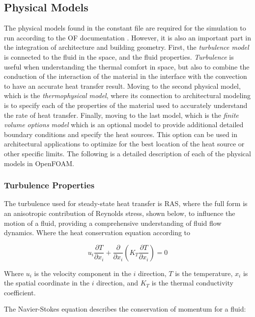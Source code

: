 \subsection{Physical Models}
The physical models found in the constant file are required for the simulation to run according to the \gls{OF} documentation \cite{OFD}. However, it is also an important part in the integration of architecture and building geometry. First, the \textit{turbulence model} is connected to the fluid in the space, and the fluid properties. \textit{Turbulence} is useful when understanding the thermal comfort in space, but also to combine the conduction of the interaction of the material in the interface with the convection to have an accurate heat transfer result. Moving to the second physical model, which is the \textit{ thermophysical model}, where its connection to architectural modeling is to specify each of the properties of the material used to accurately understand the rate of heat transfer. Finally, moving to the last model, which is the \textit{finite volume options model} which is an optional model to provide additional detailed boundary conditions and specify the heat sources.  
This option can be used in architectural applications to optimize for the best location of the heat source or other specific limits. The following is a detailed description of each of the physical models in OpenFOAM.


\subsubsection{Turbulence Properties}
The turbulence used for steady-state heat transfer is \gls{RAS}, where the full form is an anisotropic contribution of Reynolds stress, shown below, to influence the motion of a fluid, providing a comprehensive understanding of fluid flow dynamics. Where the heat conservation equation according to \cite{hce}

\begin{equation}
u_i \frac{\partial T}{\partial x_i} + \frac{\partial}{\partial x_i}(K_T \frac{\partial T}{\partial x_i}) = 0 \label{eq:heat}
\end{equation}

Where \(u_i\) is the velocity component in the \(i\) direction, \(T\) is the temperature, \(x_i\) is the spatial coordinate in the \(i\) direction, and \(K_T\) is the thermal conductivity coefficient.

The Navier-Stokes equation describes the conservation of momentum for a fluid:

